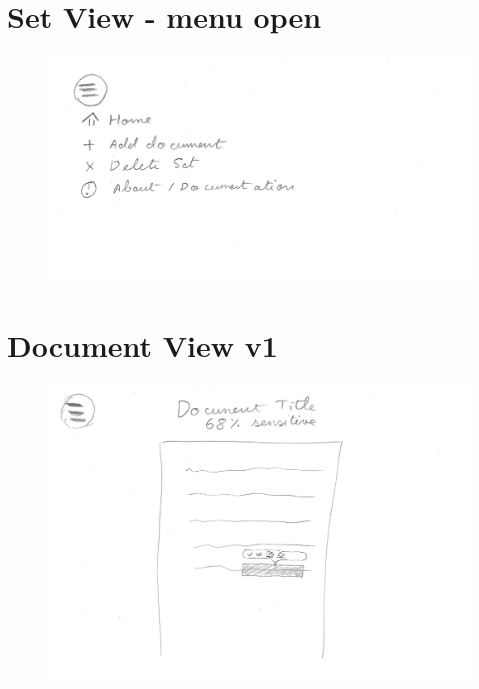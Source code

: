\documentclass[\version]{l4proj}
\begin{document}
\begin{appendices}
    \section{Set View - menu open}
    \begin{figure}[H]
        \centering
        \includegraphics[width=\linewidth]{images/wireframes/set-menu.jpg}
    \end{figure}
    \section{Document View v1}
    \begin{figure}[H]
        \centering
        \includegraphics[width=\linewidth]{images/wireframes/page.png}
    \end{figure}

\end{appendices}
\end{document}
